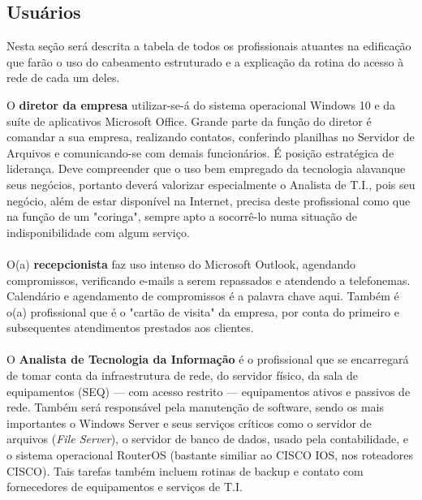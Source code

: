 \documentclass[	DIV=calc,%
							paper=a4,%
							fontsize=12pt,%
							onecolumn]{scrartcl}	 					%
\begin{document}
\subsection{Usuários}

Nesta seção será descrita a tabela de todos os profissionais atuantes na edificação que farão o uso do cabeamento estruturado e a explicação da rotina do acesso à rede de cada um deles.





O \textbf{diretor da empresa} utilizar-se-á do sistema operacional Windows 10 e da suíte de aplicativos Microsoft Office. Grande parte da função do diretor é comandar a sua empresa, realizando contatos, conferindo planilhas no Servidor de Arquivos e comunicando-se com demais funcionários. É posição estratégica de liderança. Deve compreender que o uso bem empregado da tecnologia alavanque seus negócios, portanto deverá valorizar especialmente o Analista de T.I., pois seu negócio, além de estar disponível na Internet, precisa deste profissional como que na função de um "coringa", sempre apto a socorrê-lo numa situação de indisponibilidade com algum serviço.
\\ \\
O(a) \textbf{recepcionista} faz uso intenso do Microsoft Outlook, agendando compromissos, verificando e-mails a serem repassados e atendendo a telefonemas. Calendário e agendamento de compromissos é a palavra chave aqui. Também é o(a) profissional que é o "cartão de visita" da empresa, por conta do primeiro e subsequentes atendimentos prestados aos clientes.
\\ \\
O \textbf{Analista de Tecnologia da Informação} é o profissional que se encarregará de tomar conta da infraestrutura de rede, do servidor físico, da sala de equipamentos (SEQ) --- com acesso restrito --- equipamentos ativos e passivos de rede. Também será responsável pela manutenção de software, sendo os mais importantes o Windows Server e seus serviços críticos como o servidor de arquivos (\textit{File Server}), o servidor de banco de dados, usado pela contabilidade, e o sistema operacional RouterOS (bastante similiar ao CISCO IOS, nos roteadores CISCO). Tais tarefas também incluem rotinas de backup e contato com fornecedores de equipamentos e serviços de T.I.
\end{document}
